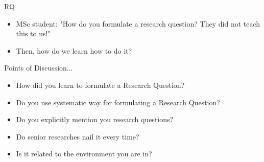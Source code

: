 \documentclass[aspectratio=169]{beamer}
\renewcommand{\cite}[1]{\footnote<.->[frame]{\fullcite{#1}}}
\begin{document}
\begin{frame}{RQ}
\begin{minipage}{0.5\textwidth}
  \begin{itemize}
    \item MSc student: "How do you formulate a research question? They did not teach this to us!"
    \item Then, how do we learn how to do it?
  \end{itemize}
\end{minipage}%

\end{frame} 



\begin{frame}{Points of Discussion...}
  \begin{itemize}
    \item How did you learn to formulate a Research Question?
    \item Do you use systematic way for formulating a Research Question?
    \item Do you explicitly mention you research questions?
    \item Do senior researches nail it every time?
    \item Is it related to the environment you are in?
  \end{itemize}
\end{frame}
\end{document}

